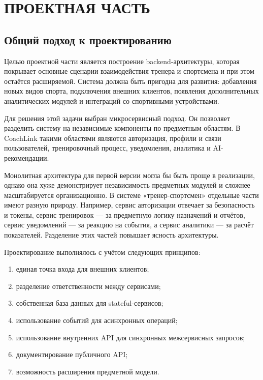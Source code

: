 \section{ПРОЕКТНАЯ ЧАСТЬ}

\subsection{Общий подход к проектированию}

Целью проектной части является построение backend-архитектуры, которая покрывает основные сценарии взаимодействия тренера и спортсмена и при этом остаётся расширяемой. Система должна быть пригодна для развития: добавления новых видов спорта, подключения внешних клиентов, появления дополнительных аналитических модулей и интеграций со спортивными устройствами.

Для решения этой задачи выбран микросервисный подход. Он позволяет разделить систему на независимые компоненты по предметным областям. В CoachLink такими областями являются авторизация, профили и связи пользователей, тренировочный процесс, уведомления, аналитика и AI-рекомендации.

Монолитная архитектура для первой версии могла бы быть проще в реализации, однако она хуже демонстрирует независимость предметных модулей и сложнее масштабируется организационно. В системе «тренер-спортсмен» отдельные части имеют разную природу. Например, сервис авторизации отвечает за безопасность и токены, сервис тренировок --- за предметную логику назначений и отчётов, сервис уведомлений --- за реакцию на события, а сервис аналитики --- за расчёт показателей. Разделение этих частей повышает ясность архитектуры.

Проектирование выполнялось с учётом следующих принципов:

\begin{enumerate}
\def\labelenumi{\arabic{enumi}.}
\tightlist
\item
  единая точка входа для внешних клиентов;
\item
  разделение ответственности между сервисами;
\item
  собственная база данных для stateful-сервисов;
\item
  использование событий для асинхронных операций;
\item
  использование внутренних API для синхронных межсервисных запросов;
\item
  документирование публичного API;
\item
  возможность расширения предметной модели.
\end{enumerate}

